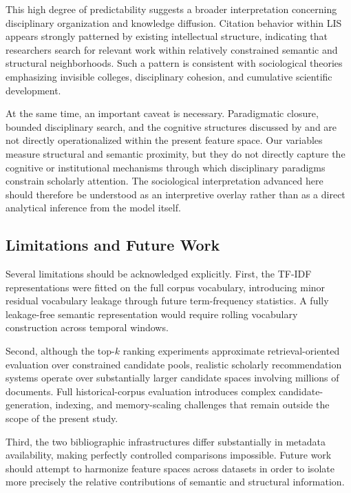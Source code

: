 \documentclass[11pt,a4paper]{article}
\begin{document}
This high degree of predictability suggests a broader interpretation concerning disciplinary organization and knowledge diffusion. Citation behavior within LIS appears strongly patterned by existing intellectual structure, indicating that researchers search for relevant work within relatively constrained semantic and structural neighborhoods. Such a pattern is consistent with sociological theories emphasizing invisible colleges, disciplinary cohesion, and cumulative scientific development.

At the same time, an important caveat is necessary. Paradigmatic closure, bounded disciplinary search, and the cognitive structures discussed by \citet{kuhn1962structure} and \citet{crane1972invisible} are not directly operationalized within the present feature space. Our variables measure structural and semantic proximity, but they do not directly capture the cognitive or institutional mechanisms through which disciplinary paradigms constrain scholarly attention. The sociological interpretation advanced here should therefore be understood as an interpretive overlay rather than as a direct analytical inference from the model itself.

\subsection{Limitations and Future Work}

Several limitations should be acknowledged explicitly. First, the TF-IDF representations were fitted on the full corpus vocabulary, introducing minor residual vocabulary leakage through future term-frequency statistics. A fully leakage-free semantic representation would require rolling vocabulary construction across temporal windows.

Second, although the top-\(k\) ranking experiments approximate retrieval-oriented evaluation over constrained candidate pools, realistic scholarly recommendation systems operate over substantially larger candidate spaces involving millions of documents. Full historical-corpus evaluation introduces complex candidate-generation, indexing, and memory-scaling challenges that remain outside the scope of the present study.

Third, the two bibliographic infrastructures differ substantially in metadata availability, making perfectly controlled comparisons impossible. Future work should attempt to harmonize feature spaces across datasets in order to isolate more precisely the relative contributions of semantic and structural information.
\end{document}
